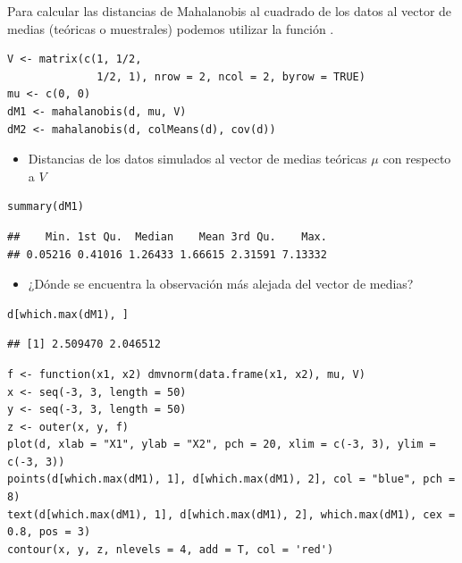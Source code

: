 Para calcular las distancias de Mahalanobis al cuadrado de los datos al vector de medias (teóricas o muestrales) podemos utilizar la función .

\begin{lstlisting}
V <- matrix(c(1, 1/2,
              1/2, 1), nrow = 2, ncol = 2, byrow = TRUE)
mu <- c(0, 0)
dM1 <- mahalanobis(d, mu, V)
dM2 <- mahalanobis(d, colMeans(d), cov(d))
\end{lstlisting}

\begin{itemize}[label=\color{red}\textbullet, leftmargin=*]
	\item \color{lightblue}Distancias de los datos simulados al vector de medias teóricas $\mu$ con respecto a $V$
\end{itemize}

\begin{lstlisting}
summary(dM1)
\end{lstlisting}

\begin{verbatim}
##    Min. 1st Qu.  Median    Mean 3rd Qu.    Max. 
## 0.05216 0.41016 1.26433 1.66615 2.31591 7.13332
\end{verbatim}

\begin{itemize}[label=\color{red}\textbullet, leftmargin=*]
	\item \color{lightblue}¿Dónde se encuentra la observación más alejada del vector de medias?
\end{itemize}

\begin{lstlisting}
d[which.max(dM1), ]
\end{lstlisting}

\begin{verbatim}
## [1] 2.509470 2.046512
\end{verbatim}

\begin{lstlisting}
f <- function(x1, x2) dmvnorm(data.frame(x1, x2), mu, V)
x <- seq(-3, 3, length = 50)
y <- seq(-3, 3, length = 50)
z <- outer(x, y, f)
plot(d, xlab = "X1", ylab = "X2", pch = 20, xlim = c(-3, 3), ylim = c(-3, 3))
points(d[which.max(dM1), 1], d[which.max(dM1), 2], col = "blue", pch = 8)
text(d[which.max(dM1), 1], d[which.max(dM1), 2], which.max(dM1), cex = 0.8, pos = 3)
contour(x, y, z, nlevels = 4, add = T, col = 'red')
\end{lstlisting}

